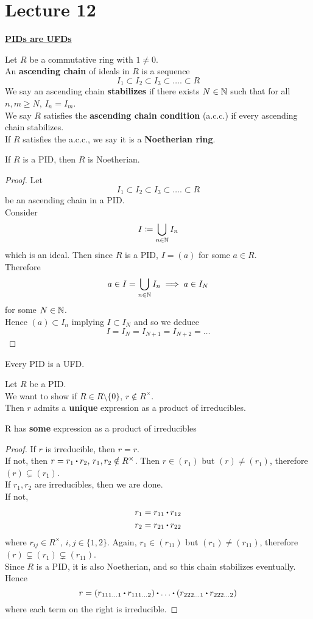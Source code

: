 \documentclass[../Main.tex]{subfiles}
\begin{document}
\chapter{Lecture 12}
\underline{\textbf{\Large PIDs are UFDs}}

\begin{dfn}[title = {Ascending Chains, Noetherian Ring}]
	Let $R$ be a commutative ring with $1\ne 0$.\\
	An \textbf{ascending chain} of ideals in $R$ is a sequence
	\[I_1\subset I_2\subset I_3\subset\dots.\subset R\]
	We say an ascending chain \textbf{stabilizes} if there exists $N\in \mathbb{N}$ such that for all $n,m \ge N$, $I_n=I_m$.\\
	We say $R$ satisfies the \textbf{ascending chain condition} (a.c.c.) if every ascending chain stabilizes.\\
	If $R$ satisfies the a.c.c., we say it is a \textbf{Noetherian ring}.
\end{dfn}
\begin{thm}
	If $R$ is a PID, then $R$ is Noetherian.
\end{thm}
\begin{proof}
	Let
	\[I_1\subset I_2\subset I_3\subset\dots.\subset R\]
	be an ascending chain in a PID.\\
	Consider
	\[I\coloneqq \bigcup\limits_{n\in \mathbb{N}} I_n\]
	which is an ideal. Then since $R$ is a PID, $I=(a)$ for some $a\in R$.\\
	Therefore
	\[a\in I =\bigcup\limits_{n\in \mathbb{N}} I_n\implies a\in I_N \]
	for some $N\in \mathbb{N}$.\\
	Hence $(a)\subset I_n$ implying $I\subset I_N$ and so we deduce
	\[I=I_N=I_{N+1}=I_{N+2}=\dots\]
\end{proof}
\begin{thm}
	Every PID is a UFD.
\end{thm}
Let $R$ be a PID.\\
We want to show if $R\in R\setminus \{0\},\, r\notin R^\times$.\\
Then $r$ admits a \textbf{unique} expression as a product of irreducibles.
\begin{lem}[title= Existence]
	R has \textbf{some} expression as a product of irreducibles
\end{lem}
\begin{proof}
	If $r$ is irreducible, then $r=r$.\\
	If not, then $r=r_1\rdot r_2,\, r_1,r_2\notin R^\times$. Then $r\in (r_1)$ but $(r)\ne (r_1)$, therefore $(r)\subsetneq (r_1)$.\\
	If $r_1,r_2$ are irreducibles, then we are done.\\
	If not, 
	\begin{align*}
	r_1=r_{11}\rdot r_{12}\\
	r_2=r_{21}\rdot r_{22}
	\end{align*}
	where $r_{ij}\in R^\times,\, i,j\in \{1,2\}$. Again, $r_1\in (r_{11})$ but $(r_1)\ne (r_{11})$, therefore $(r)\subsetneq (r_1)\subsetneq (r_{11})$.\\
	Since $R$ is a PID, it is also Noetherian, and so this chain stabilizes eventually. Hence
	\[r=(r_{111\dots1}\rdot r_{111\dots 2})\rdot \dots \rdot (r_{222\dots1}\rdot r_{222\dots 2})\]
	where each term on the right is irreducible.
\end{proof}
\end{document}
